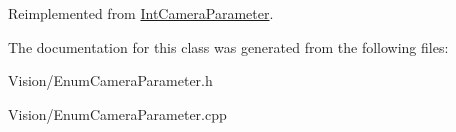 Reimplemented from \hyperlink{classIntCameraParameter_a12c5199693d1971c6feaaf634d50cca9}{IntCameraParameter}.



The documentation for this class was generated from the following files:\begin{DoxyCompactItemize}
\item 
Vision/EnumCameraParameter.h\item 
Vision/EnumCameraParameter.cpp\end{DoxyCompactItemize}
